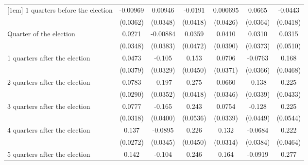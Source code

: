 \begin{table}[!ht]
\begin{tabular}{l*{6}{c}}
[1em]
 1 quarters before the election&    -0.00969         &     0.00946         &     -0.0191         &    0.000695         &      0.0665         &     -0.0443         \\
                    &    (0.0362)         &    (0.0348)         &    (0.0418)         &    (0.0426)         &    (0.0364)         &    (0.0418)         \\
[1em]
Quarter of the election&      0.0271         &    -0.00884         &      0.0359         &      0.0410         &      0.0310         &      0.0315         \\
                    &    (0.0348)         &    (0.0383)         &    (0.0472)         &    (0.0390)         &    (0.0373)         &    (0.0510)         \\
[1em]
 1 quarters after the election&      0.0473         &      -0.105\sym{**} &       0.153\sym{***}&      0.0706         &     -0.0763\sym{*}  &       0.168\sym{***}\\
                    &    (0.0379)         &    (0.0329)         &    (0.0450)         &    (0.0371)         &    (0.0366)         &    (0.0468)         \\
[1em]
 2 quarters after the election&      0.0783\sym{**} &      -0.197\sym{***}&       0.275\sym{***}&      0.0660         &      -0.138\sym{***}&       0.225\sym{***}\\
                    &    (0.0290)         &    (0.0352)         &    (0.0418)         &    (0.0346)         &    (0.0339)         &    (0.0433)         \\
[1em]
 3 quarters after the election&      0.0777\sym{*}  &      -0.165\sym{***}&       0.243\sym{***}&      0.0754\sym{*}  &      -0.128\sym{**} &       0.225\sym{***}\\
                    &    (0.0318)         &    (0.0400)         &    (0.0536)         &    (0.0339)         &    (0.0449)         &    (0.0544)         \\
[1em]
 4 quarters after the election&       0.137\sym{***}&     -0.0895\sym{**} &       0.226\sym{***}&       0.132\sym{***}&     -0.0684         &       0.222\sym{***}\\
                    &    (0.0272)         &    (0.0345)         &    (0.0450)         &    (0.0314)         &    (0.0384)         &    (0.0464)         \\
[1em]
 5 quarters after the election&       0.142\sym{***}&      -0.104\sym{**} &       0.246\sym{***}&       0.164\sym{***}&     -0.0919\sym{**} &       0.277\sym{***}\\

\end{tabular}
\end{table}
